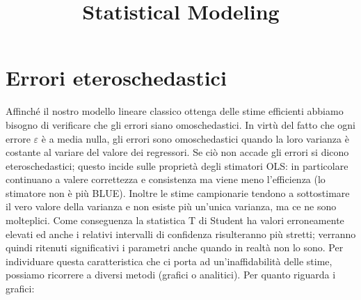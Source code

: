\documentclass[a4page, 11pt]{article}
\title{Statistical Modeling}
\author{}
\date{}
\begin{document}
\maketitle
\section{Errori eteroschedastici}
Affinché il nostro modello lineare classico ottenga delle stime efficienti abbiamo bisogno di verificare che gli errori siano omoschedastici. 
In virtù del fatto che ogni errore $\varepsilon$ è a media nulla, gli errori sono omoschedastici quando la loro varianza è costante al variare del valore dei regressori.
Se ciò non accade gli errori si dicono eteroschedastici; questo incide sulle proprietà degli stimatori OLS: in particolare continuano a valere correttezza e consistenza ma viene meno l’efficienza (lo stimatore non è più BLUE). 
Inoltre le stime campionarie tendono a sottostimare il vero valore della varianza e non esiste più un’unica varianza, ma ce ne sono molteplici. 
Come conseguenza la statistica T di Student ha valori erroneamente elevati ed anche i relativi intervalli di confidenza risulteranno più stretti; verranno quindi ritenuti significativi i parametri anche quando in realtà non lo sono. 
Per individuare questa caratteristica che ci porta ad un’inaffidabilità delle stime, possiamo ricorrere a diversi metodi (grafici o analitici).
\newline
Per quanto riguarda i grafici:
\end{document}
